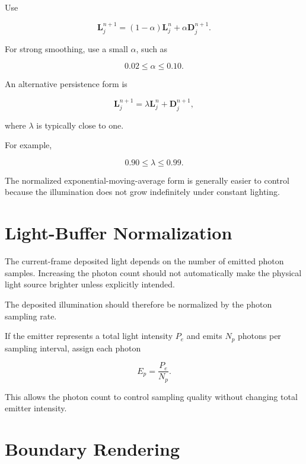 \documentclass[11pt]{article}
\begin{document}
Use

\begin{equation}
    \mathbf{L}_{j}^{n+1}
    =
    \left(1-\alpha\right)
    \mathbf{L}_{j}^{n}
    +
    \alpha
    \mathbf{D}_{j}^{n+1}.
\end{equation}

For strong smoothing, use a small $\alpha$, such as

\begin{equation}
    0.02 \leq \alpha \leq 0.10.
\end{equation}

An alternative persistence form is

\begin{equation}
    \mathbf{L}_{j}^{n+1}
    =
    \lambda
    \mathbf{L}_{j}^{n}
    +
    \mathbf{D}_{j}^{n+1},
\end{equation}

where $\lambda$ is typically close to one.

For example,

\begin{equation}
    0.90 \leq \lambda \leq 0.99.
\end{equation}

The normalized exponential-moving-average form is generally easier to control
because the illumination does not grow indefinitely under constant lighting.

\section{Light-Buffer Normalization}

The current-frame deposited light depends on the number of emitted photon
samples. Increasing the photon count should not automatically make the physical
light source brighter unless explicitly intended.

The deposited illumination should therefore be normalized by the photon
sampling rate.

If the emitter represents a total light intensity $P_{e}$ and emits $N_{p}$
photons per sampling interval, assign each photon

\begin{equation}
    E_{p}
    =
    \frac{P_{e}}{N_{p}}.
\end{equation}

This allows the photon count to control sampling quality without changing total
emitter intensity.

\section{Boundary Rendering}
\end{document}

